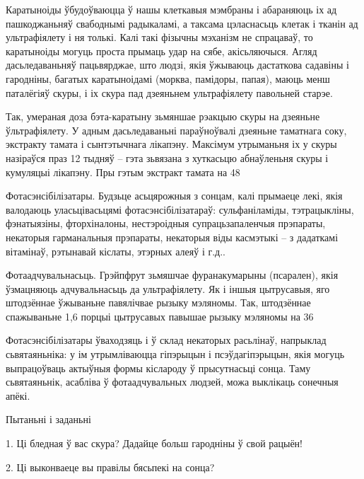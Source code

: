 Каратыноіды ўбудоўваюцца ў нашы клеткавыя мэмбраны і абараняюць іх ад пашкоджаньняў свабоднымі радыкаламі, а таксама цэласнасьць клетак і тканін ад ультрафіялету і ня толькі. Калі такі фізычны мэханізм не спрацаваў, то каратыноіды могуць проста прымаць удар на сябе, акісьляючыся. Агляд дасьледаваньняў пацьвярджае, што людзі, якія ўжываюць дастаткова садавіны і гародніны, багатых каратыноідамі (морква, памідоры, папая), маюць менш паталёгіяў скуры, і іх скура пад дзеяньнем ультрафіялету павольней старэе.

Так, умераная доза бэта-каратыну зьмяншае рэакцыю скуры на дзеяньне ўльтрафіялету. У адным дасьледаваньні параўноўвалі дзеяньне таматнага соку, экстракту тамата і сынтэтычнага лікапэну. Максімум утрыманьня іх у скуры назіраўся праз 12 тыдняў – гэта зьвязана з хуткасьцю абнаўленьня скуры і кумуляцыі лікапэну. Пры гэтым экстракт тамата на 48%

Фотасэнсібілізатары. Будзьце асьцярожныя з сонцам, калі прымаеце лекі, якія валодаюць уласьцівасьцямі фотасэнсібілізатараў: сульфаніламіды, тэтрацыкліны, фэнатыязіны, фторхіналоны, нестэроідныя супрацьзапаленчыя прэпараты, некаторыя гарманальныя прэпараты, некаторыя віды касмэтыкі – з дадаткамі вітамінаў, рэтынавай кіслаты, этэрных алеяў і г.д..

Фотаадчувальнасьць. Грэйпфрут зьмяшчае фуранакумарыны (псарален), якія ўзмацняюць адчувальнасьць да ультрафіялету. Як і іншыя цытрусавыя, яго штодзённае ўжываньне павялічвае рызыку мэляномы. Так, штодзённае спажываньне 1,6 порцыі цытрусавых павышае рызыку мэляномы на 36%

Фотасэнсібілізатары ўваходзяць і ў склад некаторых расьлінаў, напрыклад сьвятаяньніка: у ім утрымліваюцца гіпэрыцын і псэўдагіпэрыцын, якія могуць выпрацоўваць актыўныя формы кіслароду ў прысутнасьці сонца. Таму сьвятаяньнік, асабліва ў фотаадчувальных людзей, можа выклікаць сонечныя апёкі.

Пытаньні і заданьні

1. Ці бледная ў вас скура? Дадайце больш гародніны ў свой рацыён!

2. Ці выконваеце вы правілы бясьпекі на сонца?

